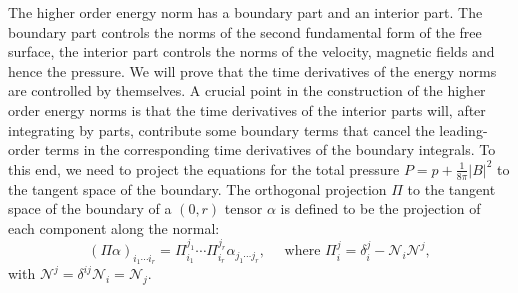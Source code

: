 \documentclass[12pt,reqno]{amsart}
\numberwithin{equation}{section}
\theoremstyle{definition}
\theoremstyle{remark}
\begin{document}
The higher order energy norm has a boundary part and an interior part. The boundary part controls the norms of the second fundamental form of the free surface, the interior part controls the norms of the velocity, magnetic fields and hence the pressure. We will prove that the time derivatives of the energy norms are controlled by themselves. A crucial point in the construction of the higher order energy norms is that the time derivatives of the interior parts will, after integrating by parts, contribute some boundary terms that cancel
the leading-order  terms in the corresponding time derivatives of the boundary integrals.   To this end,  we need to project the equations  for the total pressure $P=p+\frac{1}{8\pi}|B|^2$ to the tangent space of the boundary.  The orthogonal projection $\Pi$ to the tangent space of the boundary of a $(0, r)$ tensor $\alpha$ is defined to be the projection of each component along the normal:
\begin{equation}\label{projection}
(\Pi \alpha)_{i_1\cdots i_r}=\Pi_{i_1}^{j_1}\cdots \Pi_{i_r}^{j_r} \alpha_{j_1\cdots j_r},  \quad \text{ where } \Pi_i^j=\delta_i^j-{\mathcal{N}}_i{\mathcal{N}}^j, \end{equation}
with ${\mathcal{N}}^j=\delta^{ij} {\mathcal{N}}_i={\mathcal{N}}_j$.
\end{document}
